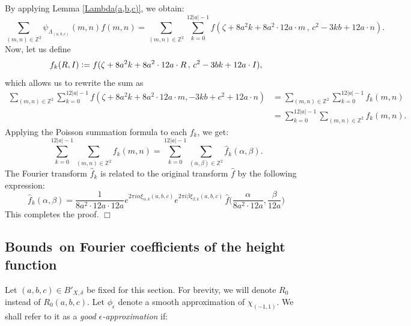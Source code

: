 \documentclass{article}
\newenvironment{proof}{\noindent {\bf Proof:}}{$\Box$ \vspace{2 ex}}
\begin{document}
\begin{proof}
By applying Lemma \ref{Lambda(a,b,c)}, we obtain:
    \begin{equation*}
        \sum_{(m, n) \in \mathbb{Z}^2} \psi_{\Lambda_{(a, b, c)}}(m, n) f(m, n) = \sum_{(m, n) \in \mathbb{Z}^2} \sum_{k=0}^{12|a| - 1} f(\zeta + 8a^2k + 8a^2 \cdot 12a \cdot m\, ,\,  c^2-3kb + 12a \cdot n).
    \end{equation*}
    Now, let us define
    \begin{equation*}
        f_k(R, I) \vcentcolon= f(\zeta + 8a^2k + 8a^2 \cdot 12a \cdot R \, ,\, c^2-3bk  + 12a \cdot I),
    \end{equation*}
    which allows us to rewrite the sum as
    \begin{align*}
        \sum_{(m, n) \in \mathbb{Z}^2} \sum_{k=0}^{12|a| - 1} f(\zeta + 8a^2k + 8a^2 \cdot 12a \cdot m, -3kb + c^2 + 12a \cdot n) 
        &= \sum_{(m, n) \in \mathbb{Z}^2} \sum_{k=0}^{12|a| - 1} f_{k}(m, n) \\
        &= \sum_{k=0}^{12|a| - 1} \sum_{(m, n) \in \mathbb{Z}^2} f_{k}(m, n).
    \end{align*}
    Applying the Poisson summation formula to each $f_k$, we get:
    \begin{equation*}
        \sum_{k=0}^{12|a| - 1} \sum_{(m, n) \in \mathbb{Z}^2} f_{k}(m, n) = \sum_{k=0}^{12|a| - 1} \sum_{(\alpha, \beta) \in \mathbb{Z}^2} \widehat{f}_{k}(\alpha, \beta).
    \end{equation*}
   The Fourier transform $\widehat{f}_k$ is related to the original transform $\widehat{f}$ by the following expression:
    \begin{equation*}
        \widehat{f}_k (\alpha, \beta) = \frac{1}{8a^2 \cdot 12a \cdot 12a} e^{2 \pi i \alpha \xi_{\alpha,k}(a, b, c)} e^{2 \pi i \beta \xi_{\beta,k}(a, b, c)} \, \widehat{f}\big(\frac{\alpha}{8a^2 \cdot 12a},\frac{\beta}{12a}\big)
        \end{equation*}
This completes the proof.
\end{proof}
\subsection{Bounds\ on Fourier coefficients of the height function}
Let $(a,b,c) \in B'_{X,\delta}$ be fixed for this section. For brevity, we will denote $R_0$ instead of $R_0(a,b,c)$. Let $\phi_\epsilon$ denote a smooth approximation of $\chi_{(-1,1)}$. We shall refer to it as a \textit{good $\epsilon$-approximation} if:
\end{document}
